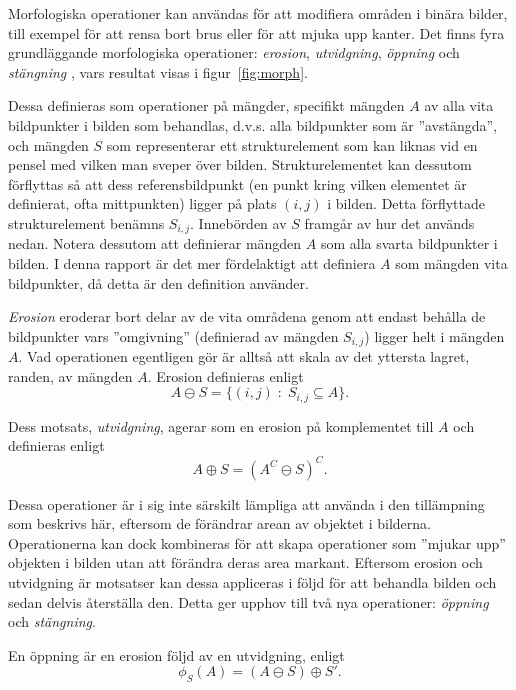 \documentclass[../rapport_MVEX01-11-05]{subfiles}
\begin{document}
Morfologiska operationer kan användas för att modifiera områden i
binära bilder, till exempel för att rensa bort brus eller för att
mjuka upp kanter. Det finns fyra grundläggande morfologiska
operationer: \emph{erosion}, \emph{utvidgning}, \emph{öppning} och
\emph{stängning} \cite[s.~25]{Rudemo09}, vars resultat visas i figur~\vref{fig:morph}.

Dessa definieras som operationer på mängder, specifikt mängden $A$
av alla vita bildpunkter i bilden som behandlas, d.v.s. alla bildpunkter som är
''avstängda'', och mängden $S$ som representerar ett strukturelement
som kan liknas vid en pensel med vilken man sveper över bilden.
Strukturelementet kan dessutom förflyttas så att dess
referensbildpunkt (en punkt kring vilken elementet är definierat, ofta
mittpunkten)
ligger på plats $(i,j)$ i bilden. Detta förflyttade
strukturelement benämns $S_{i,j}$. Innebörden av $S$ framgår av
hur det används nedan.
Notera dessutom att  definierar mängden
$A$ som alla svarta bildpunkter i bilden. I denna rapport är det mer
fördelaktigt att definiera $A$ som mängden vita bildpunkter, då detta
är den definition \MATLAB använder.

\newpage
\emph{Erosion} eroderar bort delar av de vita områdena genom
att endast behålla de bildpunkter vars ''omgivning'' (definierad av mängden
$S_{i,j}$) ligger helt i mängden $A$. Vad operationen egentligen gör är alltså
att skala av det yttersta lagret, randen, av mängden $A$. Erosion definieras enligt
\begin{equation*}
  A\ominus S = \{(i,j)\;:\;S_{i,j}\subseteq A\}.
\end{equation*}

Dess motsats, \emph{utvidgning}, agerar som
en erosion på komplementet till $A$ och definieras enligt
\begin{equation*}
  A\oplus S = (A^C\ominus S)^C.
\end{equation*}

Dessa operationer är i sig inte särskilt lämpliga att använda i den
tillämpning som beskrivs här, eftersom de förändrar
arean av objektet i bilderna. Operationerna kan dock kombineras för
att skapa operationer som
''mjukar upp'' objekten i bilden utan att förändra deras area markant.
Eftersom erosion och utvidgning är motsatser kan dessa appliceras i
följd för att behandla bilden och
sedan delvis återställa den. Detta ger upphov till två nya operationer:
\emph{öppning} och \emph{stängning}.

En öppning är en erosion följd av en utvidgning, enligt
\begin{equation*}
  \phi_S(A)=(A\ominus S)\oplus S'.
\end{equation*}
\end{document}
